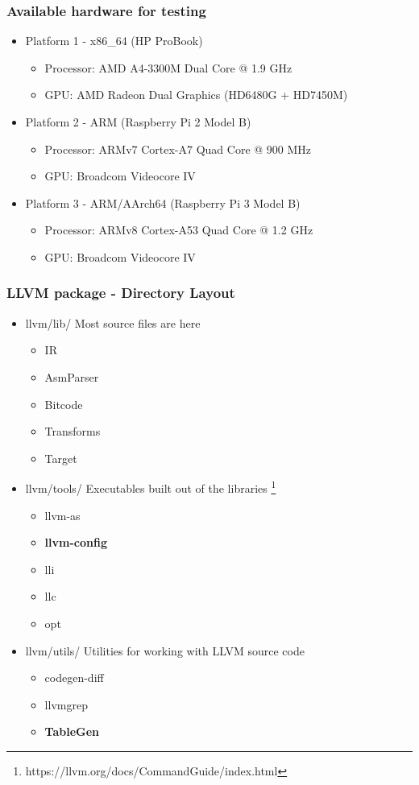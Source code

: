 \documentclass{smilebeamer}
\begin{document}
\begin{frame}
\frametitle{Available hardware for testing}
\begin{itemize}
  \item Platform 1 - x86\_64 (HP ProBook)
  \begin{itemize}
    \item Processor: AMD A4-3300M Dual Core @ 1.9 GHz
    \item GPU: AMD Radeon Dual Graphics (HD6480G + HD7450M)
  \end{itemize}
  \item Platform 2 - ARM (Raspberry Pi 2 Model B)
  \begin{itemize}
    \item Processor: ARMv7 Cortex-A7 Quad Core @ 900 MHz
    \item GPU: Broadcom Videocore IV
  \end{itemize}
  \item Platform 3 - ARM/AArch64 (Raspberry Pi 3 Model B)
  \begin{itemize}
    \item Processor: ARMv8 Cortex-A53 Quad Core @ 1.2 GHz
    \item GPU: Broadcom Videocore IV
  \end{itemize}
\end{itemize}
\end{frame}


\begin{frame}
\frametitle{LLVM package - Directory Layout}
\begin{itemize}
  \item llvm/lib/ Most source files are here
  \begin{itemize}
    \item IR
    \item AsmParser
    \item Bitcode
    \item Transforms
    \item Target
  \end{itemize}
  \item llvm/tools/ Executables built out of the libraries \footnote{https://llvm.org/docs/CommandGuide/index.html}
  \begin{itemize}
    \item llvm-as
    \item \textbf{llvm-config}
    \item lli
    \item llc
    \item opt
  \end{itemize}
  \item llvm/utils/ Utilities for working with LLVM source code
  \begin{itemize}
    \item codegen-diff
    \item llvmgrep
    \item \textbf{TableGen}
  \end{itemize}
\end{itemize}
\end{frame}
\end{document}
